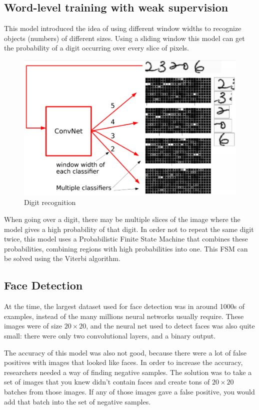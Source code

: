 \subsection{Word-level training with weak supervision}

This model introduced the idea of using different window widths to recognize objects (numbers) of different sizes.
Using a sliding window this model can get the probability of a digit occurring over every slice of pixels.

\begin{figure}[!ht]
\centering
	\includegraphics[width=0.5\linewidth]{figs/word-level.png}
	\caption{Digit recognition}
\label{fig:WordLevel}
\end{figure}

When going over a digit, there may be multiple slices of the image where the model gives a high probability of that digit.
In order not to repeat the same digit twice, this model uses a Probabilistic Finite State Machine that combines these probabilities, 
combining regions with high probabilities into one.
This FSM can be solved using the Viterbi algorithm.

\subsection{Face Detection}

At the time, the largest dataset used for face detection was in around 1000s of examples, instead of the many millions neural networks usually require.
These images were of size $20\times20$, and the neural net used to detect faces was also quite small: there were only two convolutional layers, and a binary output.

The accuracy of this model was also not good, because there were a lot of false positives with images that looked like faces.
In order to increase the accuracy, researchers needed a way of finding negative samples.
The solution was to take a set of images that you knew didn't contain faces and create tons of $20\times20$ batches from those images.
If any of those images gave a false positive, you would add that batch into the set of negative samples.

